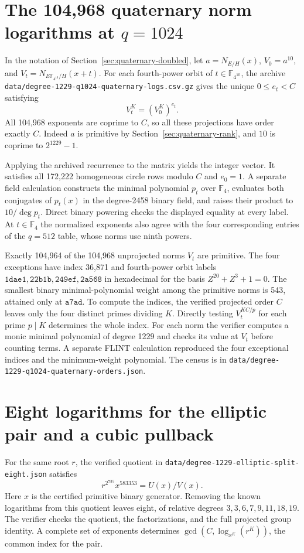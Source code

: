 \documentclass[11pt]{article}
\begin{document}
\section{The 104,968 quaternary norm logarithms at \(q=1024\)}
\label{sec:quaternary-large-logs}
In the notation of Section~\ref{sec:quaternary-doubled}, let
\(a=N_{E/H}(x)\), \(V_0=a^{10}\), and
\(V_t=N_{E\mathbb F_{4^{10}}/H}(x+t)\). For each fourth-power
orbit of \(t\in\mathbb F_{4^{10}}\), the archive
\nolinkurl{data/degree-1229-q1024-quaternary-logs.csv.gz} gives
the unique \(0\le e_t<C\) satisfying
\[
                     V_t^K=(V_0^K)^{e_t}.
\]
All 104,968 exponents are coprime to \(C\), so all these projections
have order exactly \(C\). Indeed \(a\) is primitive by
Section~\ref{sec:quaternary-rank}, and \(10\) is coprime to \(2^{1229}-1\).

Applying the archived recurrence to the matrix yields the integer
vector. It satisfies all 172,222 homogeneous circle rows modulo
\(C\) and \(e_0=1\). A separate field calculation constructs the
minimal polynomial \(p_t\) over \(\mathbb F_4\), evaluates both
conjugates of \(p_t(x)\) in the degree-2458 binary field, and raises
their product to \(10/\deg p_t\). Direct binary powering checks
the displayed equality at every label. At \(t\in\mathbb F_4\)
the normalized exponents also agree with the four corresponding
entries of the \(q=512\) table, whose norms use ninth powers.

Exactly 104,964 of the 104,968 unprojected norms \(V_t\) are
primitive. The four exceptions have index 36,871 and fourth-power
orbit labels \(\mathtt{1dae1},\mathtt{22b1b},\mathtt{249ef},
\mathtt{2a568}\) in hexadecimal for the basis
\(Z^{20}+Z^3+1=0\). The smallest binary minimal-polynomial weight
among the primitive norms is 543, attained only at \(\mathtt{a7ad}\).
To compute the indices, the verified projected order \(C\) leaves
only the four distinct primes dividing \(K\). Directly testing
\(V_t^{KC/p}\) for each prime \(p\mid K\) determines the whole
index. For each norm the verifier computes a monic minimal polynomial
of degree 1229 and checks its value at \(V_t\) before counting terms.
A separate FLINT calculation reproduced the four exceptional indices
and the minimum-weight polynomial. The census is in
\nolinkurl{data/degree-1229-q1024-quaternary-orders.json}.

\section{Eight logarithms for the elliptic pair and a cubic pullback}
\label{sec:elliptic-eight}
For the same root \(r\), the verified quotient in
\nolinkurl{data/degree-1229-elliptic-split-eight.json} satisfies
\[
              r^{2^{735}}x^{583353}=U(x)/V(x).
\]
Here \(x\) is the certified primitive binary generator. Removing the
known logarithms from this quotient leaves eight, of relative degrees
\(3,3,6,7,9,11,18,19\). The verifier checks the quotient, the
factorizations, and the full projected group identity. A complete
set of exponents determines \(\gcd(C,\log_{x^K}(r^K))\), the common
index for the pair.
\end{document}
